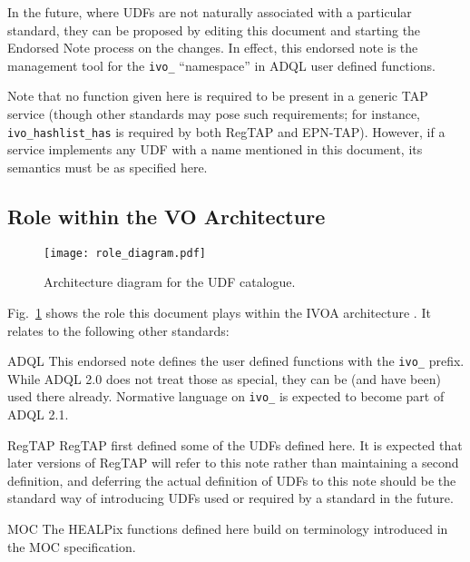 \documentclass[11pt,a4paper]{ivoa}
\begin{document}
In the future, where UDFs are not naturally associated with a
particular standard, they can be proposed by editing this document and
starting the Endorsed Note process \citep{2017ivoa.spec.0517G} on the
changes.  In effect, this endorsed note is the management tool for
the \verb|ivo_| ``namespace'' in ADQL user defined functions.

Note that no function given here is required to be present in a generic
TAP service (though other standards may pose such requirements; for
instance,
\verb|ivo_hashlist_has| is required by both
RegTAP and EPN-TAP).  However, if a service implements any UDF with a
name mentioned in this document, its semantics must be as specified here.

\subsection{Role within the VO Architecture}

\begin{figure}
\centering

\texttt{[image: role\_diagram.pdf]}
\caption{Architecture diagram for the UDF catalogue.}
\label{fig:archdiag}
\end{figure}

Fig.~\ref{fig:archdiag} shows the role this document plays within the
IVOA architecture \citep{2021ivoa.spec.1101D}.  It relates to the following
other standards:

\begin{bigdescription}
\item[ADQL \citep{2008ivoa.spec.1030O}] This endorsed note defines the
user defined functions with the \verb|ivo_| prefix.  While ADQL 2.0
does not treat those as special, they can be (and have been) used there
already.  Normative language on \verb|ivo_| is expected to become
part of ADQL 2.1.

\item[RegTAP \citep{2019ivoa.spec.1011D}] RegTAP first defined some of the
UDFs defined here.  It is expected that later versions of RegTAP will
refer to this note rather than maintaining a second definition, and
deferring the actual definition of UDFs to this note should be the
standard way of introducing UDFs used or required by a standard in the future.

\item[MOC \citep{2019ivoa.spec.1007F}] The HEALPix functions defined
here build on terminology introduced in the MOC specification.
\end{bigdescription}
\end{document}
